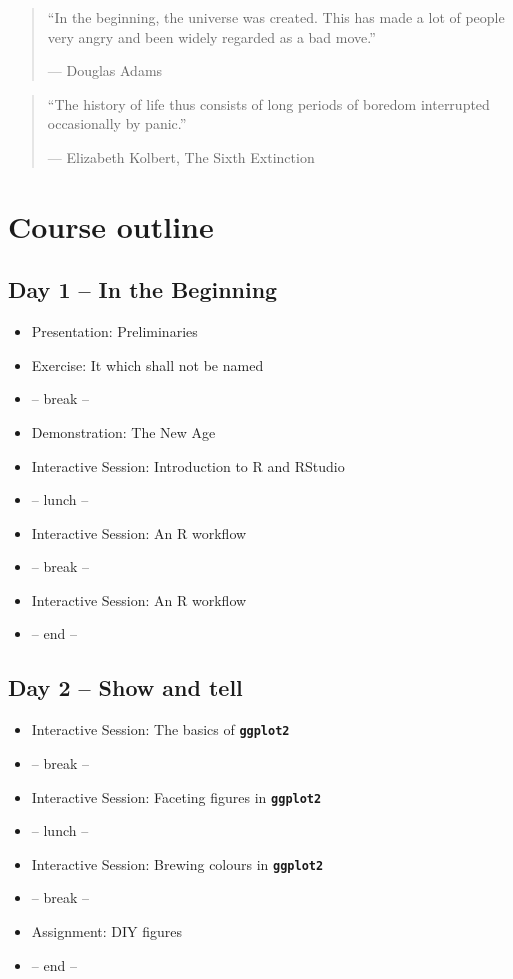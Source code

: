 \documentclass[]{book}
\providecommand{\tightlist}{%
  \setlength{\itemsep}{0pt}\setlength{\parskip}{0pt}}
\theoremstyle{definition}
\theoremstyle{definition}
\theoremstyle{definition}
\theoremstyle{remark}
\begin{document}
\begin{quote}
``In the beginning, the universe was created. This has made a lot of
people very angry and been widely regarded as a bad move.''

--- Douglas Adams
\end{quote}

\begin{quote}
``The history of life thus consists of long periods of boredom
interrupted occasionally by panic.''

--- Elizabeth Kolbert, The Sixth Extinction
\end{quote}

\section{Course outline}\label{course-outline}

\subsection*{Day 1 -- In the Beginning}\label{day-1-in-the-beginning}

\begin{itemize}
\tightlist
\item
  Presentation: Preliminaries
\item
  Exercise: It which shall not be named
\item
  -- break --
\item
  Demonstration: The New Age
\item
  Interactive Session: Introduction to R and RStudio
\item
  -- lunch --
\item
  Interactive Session: An R workflow
\item
  -- break --
\item
  Interactive Session: An R workflow
\item
  -- end --
\end{itemize}

\subsection*{Day 2 -- Show and tell}\label{day-2-show-and-tell}

\begin{itemize}
\tightlist
\item
  Interactive Session: The basics of \textbf{\texttt{ggplot2}}
\item
  -- break --
\item
  Interactive Session: Faceting figures in \textbf{\texttt{ggplot2}}
\item
  -- lunch --
\item
  Interactive Session: Brewing colours in \textbf{\texttt{ggplot2}}
\item
  -- break --
\item
  Assignment: DIY figures
\item
  -- end --
\end{itemize}
\end{document}
